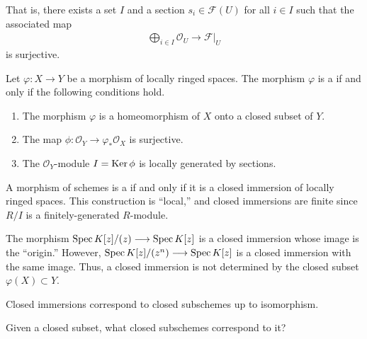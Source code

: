 \documentclass [11 pt, oneside] {article}
\begin{document}
\begin{remark}
	That is, there exists a set $I$ and a section $s_i\in \mathscr{F}(U)$ for all $i\in I$ such that the associated map
	\begin{align*}
		\bigoplus_{i\in I}\mathscr{O}_U\longrightarrow \mathscr{F}\big|_U
	\end{align*}
	is surjective.
\end{remark}

\begin{definition}\label{}\text{}
Let $\varphi : X\longrightarrow Y$ be a morphism of locally ringed spaces. The morphism $\varphi$ is a  if and only if the following conditions hold.
\begin{enumerate}
	\item The morphism $\varphi$ is a homeomorphism of $X$ onto a closed subset of $Y$.
	\item The map $\phi : \mathscr{O}_Y \longrightarrow \varphi_* \mathscr{O}_X$ is surjective.
	\item The $\mathscr{O}_Y$-module $\relax{I} = \operatorname{Ker} \phi$ is locally generated by sections.
\end{enumerate}
\end{definition}

A morphism of schemes is a  if and only if it is a closed immersion of locally ringed spaces. This construction is ``local,'' and closed immersions are finite since $R/I$ is a finitely-generated $R$-module. 

\begin{example}[ ]\label{ci_1}\text{}
The morphism $\operatorname{Spec} K[z]/(z) \longrightarrow \operatorname{Spec} K[z]$ is a closed immersion whose image is the ``origin.'' However, $\operatorname{Spec} K[z] /(z^n)\longrightarrow \operatorname{Spec} K[z]$ is a closed immersion with the same image. Thus, a closed immersion is not determined by the closed subset $\varphi (X)\subset Y$. 
\end{example}

\begin{remark}
	Closed immersions correspond to closed subschemes up to isomorphism.
\end{remark}

\begin{problem}
	Given a closed subset, what closed subschemes correspond to it?
\end{problem}
\end{document}
